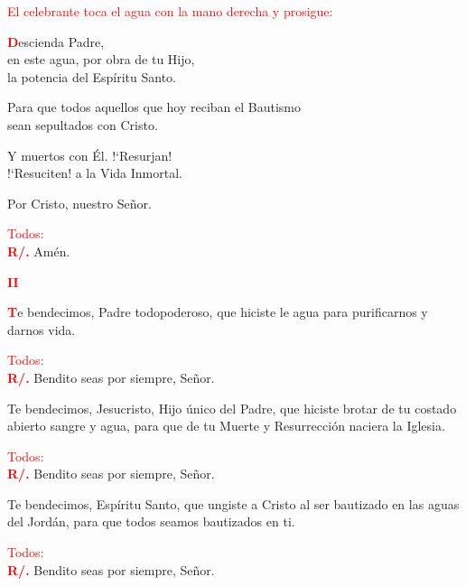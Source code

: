 \documentclass[12pt, letterpaper, spanish]{article}
\begin{document}
  \large {\textcolor{red}{El celebrante toca el agua con la mano derecha y prosigue:}}

  \lettrine[lines=2]{\bfseries \textcolor{red}{D}}{}\Large escienda Padre,\\ 
  en este agua, por obra de tu Hijo,\\ 
  la potencia del Esp\'iritu Santo.

  \noindent
  Para que todos aquellos que hoy reciban el Bautismo\\ 
  sean sepultados con Cristo.

  \noindent
  Y muertos con \'El. !`Resurjan!\\ 
  !`Resuciten! a la Vida Inmortal.

  \noindent
  Por Cristo, nuestro Se\~nor.

  \large {\textcolor{red}{Todos:}}\\
  \Large {\bfseries \textcolor{red}{R/.}} \hspace{0.5cm} Am\'en.

  \clearpage

  \begin{center}
    \Large {\bfseries \textcolor{red}{II}} 
  \end{center}

  \lettrine[lines=2]{\bfseries \textcolor{red}{T}}{}\Large e bendecimos, Padre todopoderoso, que hiciste le agua para purificarnos y darnos vida.

  \large {\textcolor{red}{Todos:}}\\
  \Large {\bfseries \textcolor{red}{R/.}} \hspace{0.5cm} Bendito seas por siempre, Se\~nor.

  \noindent
  Te bendecimos, Jesucristo, Hijo \'unico del Padre, que hiciste brotar de tu costado abierto sangre y agua, para que de tu Muerte y Resurrecci\'on naciera la Iglesia.

  \large {\textcolor{red}{Todos:}}\\
  \Large {\bfseries \textcolor{red}{R/.}} \hspace{0.5cm} Bendito seas por siempre, Se\~nor.

  \noindent
  Te bendecimos, Esp\'iritu Santo, que ungiste a Cristo al ser bautizado en las aguas del Jord\'an, para que todos seamos bautizados en ti.

  \large {\textcolor{red}{Todos:}}\\
  \Large {\bfseries \textcolor{red}{R/.}} \hspace{0.5cm} Bendito seas por siempre, Se\~nor.
\end{document}
